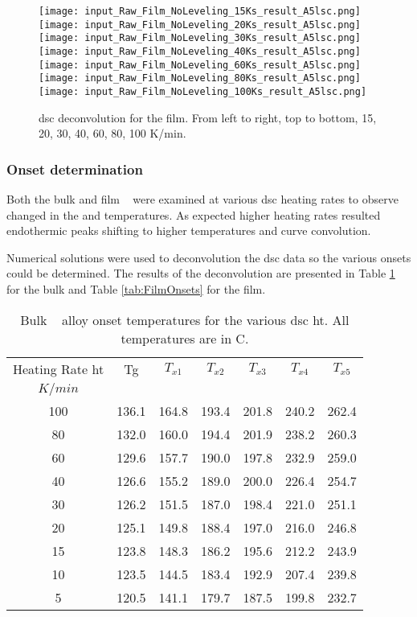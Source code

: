 \documentclass[a4paper,12pt,oneside]{article}%
\begin{document}
\begin{figure}[b]
	\centering
	\texttt{[image: input\_Raw\_Film\_NoLeveling\_15Ks\_result\_A5lsc.png]}\quad
	\texttt{[image: input\_Raw\_Film\_NoLeveling\_20Ks\_result\_A5lsc.png]}\quad
	\texttt{[image: input\_Raw\_Film\_NoLeveling\_30Ks\_result\_A5lsc.png]}
	\medskip
	\texttt{[image: input\_Raw\_Film\_NoLeveling\_40Ks\_result\_A5lsc.png]}\quad
	\texttt{[image: input\_Raw\_Film\_NoLeveling\_60Ks\_result\_A5lsc.png]}\quad
	\texttt{[image: input\_Raw\_Film\_NoLeveling\_80Ks\_result\_A5lsc.png]}
	\medskip
	\texttt{[image: input\_Raw\_Film\_NoLeveling\_100Ks\_result\_A5lsc.png]}
	\caption{\acrshort{dsc} deconvolution for the film. From left to right, top to bottom, 15, 20, 30, 40, 60, 80, 100 K/min.}
	\label{fig:DSC_Film_Decon}
\end{figure}

\subsubsection{Onset determination}

Both the bulk and film \MgZnCa~ were examined at various \acrshort{dsc} heating rates to observe changed in the \Tg and \Tx temperatures. As expected higher heating rates resulted endothermic peaks shifting to higher temperatures and curve convolution. 

Numerical solutions were used to deconvolution the \acrshort{dsc} data so the various \Tx onsets could be determined. The results of the deconvolution are presented in Table \ref{tab:BulkOnsets} for the bulk and Table \ref{tab:FilmOnsets} for the film.

\begin{table}[h]
	\centering
	\begin{tabular}{ c c c c c c c }
		\toprule
		Heating Rate \acrshort{ht} & \acrshort{Tg} & $T_{x1}$ & $T_{x2}$ & $T_{x3}$ & $T_{x4}$ & $T_{x5}$ \\ 
		$K/min$ & & & & & & \\
		\midrule
		100 & 136.1 & 164.8 & 193.4 & 201.8 & 240.2 & 262.4 \\
		80  & 132.0 & 160.0 & 194.4 & 201.9 & 238.2 & 260.3 \\
		60  & 129.6 & 157.7 & 190.0 & 197.8 & 232.9 & 259.0 \\
		40  & 126.6 & 155.2 & 189.0 & 200.0 & 226.4 & 254.7 \\
		30  & 126.2 & 151.5 & 187.0 & 198.4 & 221.0 & 251.1 \\
		20  & 125.1 & 149.8 & 188.4 & 197.0 & 216.0 & 246.8 \\
		15  & 123.8 & 148.3 & 186.2 & 195.6 & 212.2 & 243.9 \\
		10  & 123.5 & 144.5 & 183.4 & 192.9 & 207.4 & 239.8 \\
		5   & 120.5 & 141.1 & 179.7 & 187.5 & 199.8 & 232.7 \\ 
		\bottomrule
	\end{tabular}
	\caption{Bulk \MgZnCa~ alloy onset temperatures for the various \acrshort{dsc}  \acrshort{ht}. All temperatures are in \degree C.}
	\label{tab:BulkOnsets}
\end{table}
\end{document}
